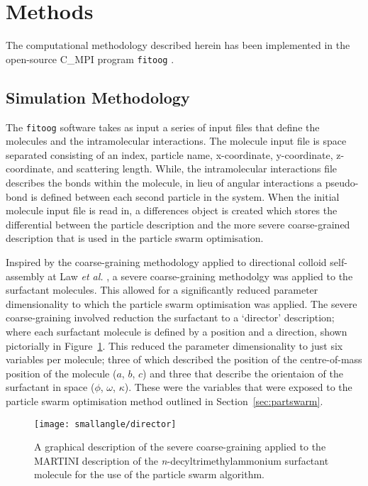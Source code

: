 \section{Methods}

The computational methodology described herein has been implemented in the open-source C\_MPI program \texttt{fitoog} \cite{mccluskey_arm61/fitoog_2019}.

\subsection{Simulation Methodology}

The \texttt{fitoog} software takes as input a series of input files that define the molecules and the intramolecular interactions. 
The molecule input file is space separated consisting of an index, particle name, x-coordinate, y-coordinate, z-coordinate, and scattering length. 
While, the intramolecular interactions file describes the bonds within the molecule, in lieu of angular interactions a pseudo-bond is defined between each second particle in the system. 
When the initial molecule input file is read in, a differences object is created which stores the differential between the particle description and the more severe coarse-grained description that is used in the particle swarm optimisation. 

Inspired by the coarse-graining methodology applied to directional colloid self-assembly at Law \emph{et al.} \cite{law_coarse-grained_2016}, a severe coarse-graining methodolgy was applied to the surfactant molecules.
This allowed for a significantly reduced parameter dimensionality to which the particle swarm optimisation was applied. 
The severe coarse-graining involved reduction the surfactant to a `director' description; where each surfactant molecule is defined by a position and a direction, shown pictorially in Figure~\ref{fig:director}.
This reduced the parameter dimensionality to just six variables per molecule; three of which described the position of the centre-of-mass position of the molecule ($a$, $b$, $c$) and three that describe the orientaion of the surfactant in space ($\phi$, $\omega$, $\kappa$).
These were the variables that were exposed to the particle swarm optimisation method outlined in Section~\ref{sec:partswarm}.
%
\begin{figure}
    \centering
    \texttt{[image: smallangle/director]}
    \caption{A graphical description of the severe coarse-graining applied to the MARTINI description of the \emph{n}-decyltrimethylammonium surfactant molecule for the use of the particle swarm algorithm.}
    \label{fig:director}
\end{figure}
%

